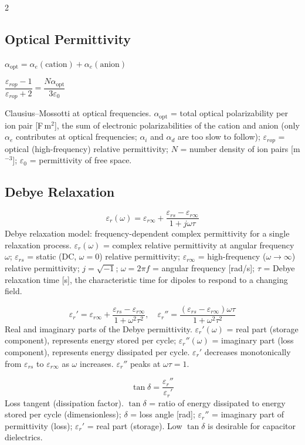 \documentclass[9pt]{extarticle}
\newcommand{\desc}[1]{{\small\color{desc}#1}}
\begin{document}
\begin{multicols}{2}
\subsection{Optical Permittivity}
$\alpha_{\text{opt}} = \alpha_e(\text{cation}) + \alpha_e(\text{anion})$

$\dfrac{\varepsilon_{rop}-1}{\varepsilon_{rop}+2} = \dfrac{N\alpha_{\text{opt}}}{3\varepsilon_0}$

\desc{Clausius--Mossotti at optical frequencies. $\alpha_{\text{opt}}$ = total optical polarizability per ion pair [F\,m$^2$], the sum of electronic polarizabilities of the cation and anion (only $\alpha_e$ contributes at optical frequencies; $\alpha_i$ and $\alpha_d$ are too slow to follow); $\varepsilon_{rop}$ = optical (high-frequency) relative permittivity; $N$ = number density of ion pairs [m$^{-3}$]; $\varepsilon_0$ = permittivity of free space.}

\subsection{Debye Relaxation}
\[\varepsilon_r(\omega) = \varepsilon_{r\infty} + \frac{\varepsilon_{rs}-\varepsilon_{r\infty}}{1+j\omega\tau}\]
\desc{Debye relaxation model: frequency-dependent complex permittivity for a single relaxation process. $\varepsilon_r(\omega)$ = complex relative permittivity at angular frequency $\omega$; $\varepsilon_{rs}$ = static (DC, $\omega = 0$) relative permittivity; $\varepsilon_{r\infty}$ = high-frequency ($\omega \to \infty$) relative permittivity; $j = \sqrt{-1}$; $\omega = 2\pi f$ = angular frequency [rad/s]; $\tau$ = Debye relaxation time [s], the characteristic time for dipoles to respond to a changing field.}

\[\varepsilon_r' = \varepsilon_{r\infty} + \frac{\varepsilon_{rs}-\varepsilon_{r\infty}}{1+\omega^2\tau^2}, \quad \varepsilon_r'' = \frac{(\varepsilon_{rs}-\varepsilon_{r\infty})\omega\tau}{1+\omega^2\tau^2}\]
\desc{Real and imaginary parts of the Debye permittivity. $\varepsilon_r'(\omega)$ = real part (storage component), represents energy stored per cycle; $\varepsilon_r''(\omega)$ = imaginary part (loss component), represents energy dissipated per cycle. $\varepsilon_r'$ decreases monotonically from $\varepsilon_{rs}$ to $\varepsilon_{r\infty}$ as $\omega$ increases. $\varepsilon_r''$ peaks at $\omega\tau = 1$.}

\[\tan\delta = \frac{\varepsilon_r''}{\varepsilon_r'}\]
\desc{Loss tangent (dissipation factor). $\tan\delta$ = ratio of energy dissipated to energy stored per cycle (dimensionless); $\delta$ = loss angle [rad]; $\varepsilon_r''$ = imaginary part of permittivity (loss); $\varepsilon_r'$ = real part (storage). Low $\tan\delta$ is desirable for capacitor dielectrics.}


\end{multicols}
\end{document}
